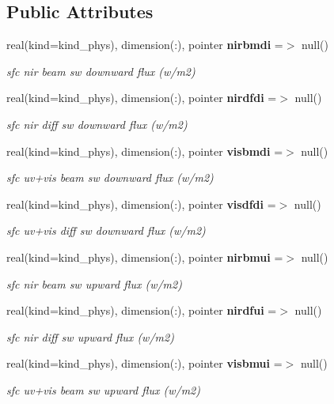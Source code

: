 \subsection*{Public Attributes}
\begin{DoxyCompactItemize}
\item 
real(kind=kind\+\_\+phys), dimension(\+:), pointer \textbf{ nirbmdi} =$>$ null()
\begin{DoxyCompactList}\small\item\em sfc nir beam sw downward flux (w/m2) \end{DoxyCompactList}\item 
real(kind=kind\+\_\+phys), dimension(\+:), pointer \textbf{ nirdfdi} =$>$ null()
\begin{DoxyCompactList}\small\item\em sfc nir diff sw downward flux (w/m2) \end{DoxyCompactList}\item 
real(kind=kind\+\_\+phys), dimension(\+:), pointer \textbf{ visbmdi} =$>$ null()
\begin{DoxyCompactList}\small\item\em sfc uv+vis beam sw downward flux (w/m2) \end{DoxyCompactList}\item 
real(kind=kind\+\_\+phys), dimension(\+:), pointer \textbf{ visdfdi} =$>$ null()
\begin{DoxyCompactList}\small\item\em sfc uv+vis diff sw downward flux (w/m2) \end{DoxyCompactList}\item 
real(kind=kind\+\_\+phys), dimension(\+:), pointer \textbf{ nirbmui} =$>$ null()
\begin{DoxyCompactList}\small\item\em sfc nir beam sw upward flux (w/m2) \end{DoxyCompactList}\item 
real(kind=kind\+\_\+phys), dimension(\+:), pointer \textbf{ nirdfui} =$>$ null()
\begin{DoxyCompactList}\small\item\em sfc nir diff sw upward flux (w/m2) \end{DoxyCompactList}\item 
real(kind=kind\+\_\+phys), dimension(\+:), pointer \textbf{ visbmui} =$>$ null()
\begin{DoxyCompactList}\small\item\em sfc uv+vis beam sw upward flux (w/m2) \end{DoxyCompactList}\item 

\end{DoxyCompactItemize}
